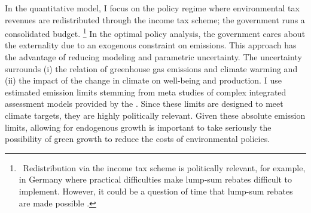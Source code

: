 In the quantitative model, I focus on the policy regime where environmental tax revenues are redistributed through the income tax scheme; the government runs a consolidated budget. \footnote{\  Redistribution via the income tax scheme is politically relevant, for example, in Germany where practical difficulties make lump-sum rebates difficult to implement. However, it could be a question of time that lump-sum rebates are made possible \citep{ZeitArt}.}
In the optimal policy analysis, the government cares about the externality due to an exogenous constraint on emissions. This approach has the advantage of reducing modeling and parametric uncertainty. The uncertainty surrounds (i) the relation of greenhouse gas emissions and climate warming and (ii) the impact of the change in climate on well-being and production. I use estimated emission limits stemming from meta studies of complex integrated assessment models provided by the \cite{IPCC2022}. Since these limits are designed to meet climate targets, they are highly politically relevant.  
Given these absolute emission limits, allowing for endogenous growth is important to take seriously the possibility of green growth to reduce the costs of environmental policies. %



